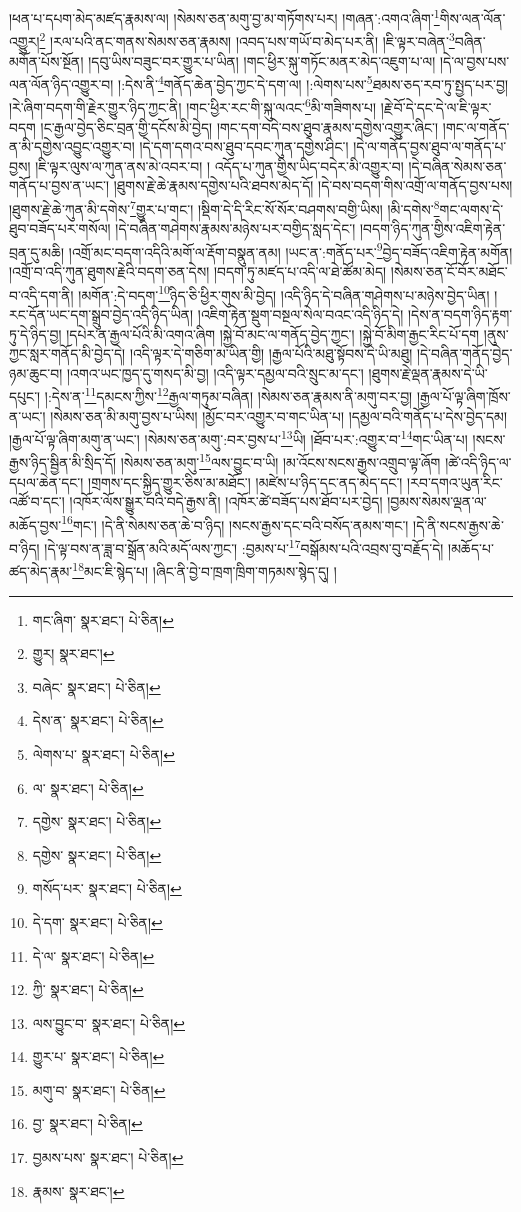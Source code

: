 །ཕན་པ་དཔག་མེད་མཛད་རྣམས་ལ། །སེམས་ཅན་མགུ་བྱ་མ་གཏོགས་པར། །གཞན་:འགའ་ཞིག་\footnote{གང་ཞིག་  སྣར་ཐང་།  པེ་ཅིན། }གིས་ལན་ལོན་འགྱུར།\footnote{གྱུར།  སྣར་ཐང་། } །རལ་པའི་ནང་གནས་སེམས་ཅན་རྣམས། །འབད་པས་གཡོ་བ་མེད་པར་ནི། །ཇི་ལྟར་བཞེན་\footnote{བཞེང་  སྣར་ཐང་།  པེ་ཅིན། }བཞིན་མགོན་པོས་སྔོན། །དབུ་ཡིས་བཟུང་བར་གྱུར་པ་ཡིན། །གང་ཕྱིར་སྐུ་གཏོང་མནར་མེད་འཇུག་པ་ལ། །དེ་ལ་བྱས་པས་ལན་ལོན་ཉིད་འགྱུར་བ། །:དེས་ནི་\footnote{དེས་ན་  སྣར་ཐང་།  པེ་ཅིན། }གནོད་ཆེན་བྱེད་ཀྱང་དེ་དག་ལ། །:ལེགས་པས་\footnote{ལེགས་པ་  སྣར་ཐང་།  པེ་ཅིན། }ཐམས་ཅད་རབ་ཏུ་སྤྱད་པར་བྱ། །རེ་ཞིག་བདག་གི་རྗེར་གྱུར་ཉིད་ཀྱང་ནི། །གང་ཕྱིར་རང་གི་སྐུ་ལའང་\footnote{ལ་  སྣར་ཐང་།  པེ་ཅིན། }མི་གཟིགས་པ། །རྗེ་བོ་དེ་དང་དེ་ལ་ཇི་ལྟར་བདག །ང་རྒྱལ་བྱེད་ཅིང་བྲན་གྱི་དངོས་མི་བྱེད། །གང་དག་བདེ་བས་ཐུབ་རྣམས་དགྱེས་འགྱུར་ཞིང་། །གང་ལ་གནོད་ན་མི་དགྱེས་འབྱུང་འགྱུར་བ། །དེ་དག་དགའ་བས་ཐུབ་དབང་ཀུན་དགྱེས་ཤིང་། །དེ་ལ་གནོད་བྱས་ཐུབ་ལ་གནོད་པ་བྱས། །ཇི་ལྟར་ལུས་ལ་ཀུན་ནས་མེ་འབར་བ། །
འདོད་པ་ཀུན་གྱིས་ཡིད་བདེར་མི་འགྱུར་བ། །དེ་བཞིན་སེམས་ཅན་གནོད་པ་བྱས་ན་ཡང་། །ཐུགས་རྗེ་ཆེ་རྣམས་དགྱེས་པའི་ཐབས་མེད་དོ། །དེ་བས་བདག་གིས་འགྲོ་ལ་གནོད་བྱས་པས། །ཐུགས་རྗེ་ཆེ་ཀུན་མི་དགེས་\footnote{དགྱེས་  སྣར་ཐང་།  པེ་ཅིན། }གྱུར་པ་གང་། །སྡིག་དེ་དི་རིང་སོ་སོར་བཤགས་བགྱི་ཡིས། །མི་དགེས་\footnote{དགྱེས་  སྣར་ཐང་།  པེ་ཅིན། }གང་ལགས་དེ་ཐུབ་བཟོད་པར་གསོལ། །དེ་བཞིན་གཤེགས་རྣམས་མཉེས་པར་བགྱིད་སླད་དེང་། །བདག་ཉིད་ཀུན་གྱིས་འཇིག་རྟེན་བྲན་དུ་མཆི། །འགྲོ་མང་བདག་འདིའི་མགོ་ལ་རྡོག་བསྣུན་ནམ། །ཡང་ན་:གནོད་པར་\footnote{གསོད་པར་  སྣར་ཐང་།  པེ་ཅིན། }བྱེད་བཟོད་འཇིག་རྟེན་མགོན། །འགྲོ་བ་འདི་ཀུན་ཐུགས་རྗེའི་བདག་ཅན་དེས། །བདག་ཏུ་མཛད་པ་འདི་ལ་ཐེ་ཚོམ་མེད། །སེམས་ཅན་ངོ་བོར་མཐོང་བ་འདི་དག་ནི། །མགོན་:དེ་བདག་\footnote{དེ་དག་  སྣར་ཐང་།  པེ་ཅིན། }ཉིད་ཅི་ཕྱིར་གུས་མི་བྱེད། །འདི་ཉིད་དེ་བཞིན་གཤེགས་པ་མཉེས་བྱེད་ཡིན། །རང་དོན་ཡང་དག་སྒྲུབ་བྱེད་འདི་ཉིད་ཡིན། །འཇིག་རྟེན་སྡུག་བསྔལ་སེལ་བའང་འདི་ཉིད་དེ། །དེས་ན་བདག་ཉིད་རྟག་ཏུ་དེ་ཉིད་བྱ། །དཔེར་ན་རྒྱལ་པོའི་མི་འགའ་ཞིག །སྐྱེ་བོ་མང་ལ་གནོད་བྱེད་ཀྱང་། །སྐྱེ་བོ་མིག་རྒྱང་རིང་པོ་དག །ནུས་ཀྱང་སླར་གནོད་མི་བྱེད་དེ། །འདི་ལྟར་དེ་གཅིག་མ་ཡིན་གྱི། །རྒྱལ་པོའི་མཐུ་སྟོབས་དེ་ཡི་མཐུ། །དེ་བཞིན་གནོད་བྱེད་ཉམ་ཆུང་བ། །འགའ་ཡང་ཁྱད་དུ་གསད་མི་བྱ། །འདི་ལྟར་དམྱལ་བའི་སྲུང་མ་དང་། །ཐུགས་རྗེ་ལྡན་རྣམས་དེ་ཡི་དཔུང་། །:དེས་ན་\footnote{དེ་ལ་  སྣར་ཐང་།  པེ་ཅིན། }དམངས་ཀྱིས་\footnote{ཀྱི་  སྣར་ཐང་།  པེ་ཅིན། }རྒྱལ་གཏུམ་བཞིན། །སེམས་ཅན་རྣམས་ནི་མགུ་བར་བྱ། །རྒྱལ་པོ་ལྟ་ཞིག་ཁྲོས་ན་ཡང་། །སེམས་ཅན་མི་མགུ་བྱས་པ་ཡིས། །མྱོང་བར་འགྱུར་བ་གང་ཡིན་པ། །དམྱལ་བའི་གནོད་པ་དེས་བྱེད་དམ། །རྒྱལ་པོ་ལྟ་ཞིག་མགུ་ན་ཡང་། །སེམས་ཅན་མགུ་:བར་བྱས་པ་\footnote{ལས་བྱུང་བ་  སྣར་ཐང་།  པེ་ཅིན། }ཡི། །ཐོབ་པར་:འགྱུར་བ་\footnote{གྱུར་པ་  སྣར་ཐང་།  པེ་ཅིན། }གང་ཡིན་པ། །སངས་རྒྱས་ཉིད་སྦྱིན་མི་སྲིད་དོ། །སེམས་ཅན་མགུ་\footnote{མགུ་བ་  སྣར་ཐང་།  པེ་ཅིན། }ལས་བྱུང་བ་ཡི། །མ་འོངས་སངས་རྒྱས་འགྲུབ་ལྟ་ཞོག །ཚེ་འདི་ཉིད་ལ་དཔལ་ཆེན་དང་། །གྲགས་དང་སྐྱིད་གྱུར་ཅིས་མ་མཐོང་། །མཛེས་པ་ཉིད་དང་ནད་མེད་དང་། །རབ་དགའ་ཡུན་རིང་འཚོ་བ་དང་། །འཁོར་ལོས་སྒྱུར་བའི་བདེ་རྒྱས་ནི། །འཁོར་ཚེ་བཟོད་པས་ཐོབ་པར་བྱེད། །བྱམས་སེམས་ལྡན་ལ་མཆོད་བྱས་\footnote{བྱ་  སྣར་ཐང་།  པེ་ཅིན། }གང་། །དེ་ནི་སེམས་ཅན་ཆེ་བ་ཉིད། །སངས་རྒྱས་དང་བའི་བསོད་ནམས་གང་། །དེ་ནི་སངས་རྒྱས་ཆེ་བ་ཉིད། །དེ་ལྟ་བས་ན་ཟླ་བ་སྒྲོན་མའི་མདོ་ལས་ཀྱང་། :བྱམས་པ་\footnote{བྱམས་པས་  སྣར་ཐང་།  པེ་ཅིན། }བསྒོམས་པའི་འབྲས་བུ་བརྗོད་དེ། །མཆོད་པ་ཚད་མེད་རྣམ་\footnote{རྣམས་  སྣར་ཐང་། }མང་ཇི་སྙེད་པ། །ཞིང་ནི་བྱེ་བ་ཁྲག་ཁྲིག་གཏམས་སྙེད་དུ། །
